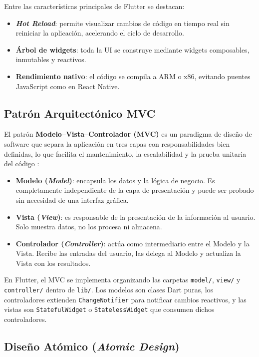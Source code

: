 \documentclass[12pt,a4paper]{article}
\begin{document}
Entre las características principales de Flutter se destacan:

\begin{itemize}
  \item \textbf{\textit{Hot Reload}}: permite visualizar cambios de código en tiempo real sin reiniciar la aplicación, acelerando el ciclo de desarrollo.
  \item \textbf{Árbol de widgets}: toda la UI se construye mediante widgets composables, inmutables y reactivos.
  \item \textbf{Rendimiento nativo}: el código se compila a ARM o x86, evitando puentes JavaScript como en React Native.
\end{itemize}

\subsection{Patrón Arquitectónico MVC}

El patrón \textbf{Modelo--Vista--Controlador (MVC)} es un paradigma de diseño de software que separa la aplicación en tres capas con responsabilidades bien definidas, lo que facilita el mantenimiento, la escalabilidad y la prueba unitaria del código \cite{gamma1994}:

\begin{itemize}
  \item \textbf{Modelo (\textit{Model})}: encapsula los datos y la lógica de negocio. Es completamente independiente de la capa de presentación y puede ser probado sin necesidad de una interfaz gráfica.
  \item \textbf{Vista (\textit{View})}: es responsable de la presentación de la información al usuario. Solo muestra datos, no los procesa ni almacena.
  \item \textbf{Controlador (\textit{Controller})}: actúa como intermediario entre el Modelo y la Vista. Recibe las entradas del usuario, las delega al Modelo y actualiza la Vista con los resultados.
\end{itemize}

En Flutter, el MVC se implementa organizando las carpetas \texttt{model/}, \texttt{view/} y \texttt{controller/} dentro de \texttt{lib/}. Los modelos son clases Dart puras, los controladores extienden \texttt{ChangeNotifier} para notificar cambios reactivos, y las vistas son \texttt{StatefulWidget} o \texttt{StatelessWidget} que consumen dichos controladores.

\subsection{Diseño Atómico (\textit{Atomic Design})}
\end{document}

